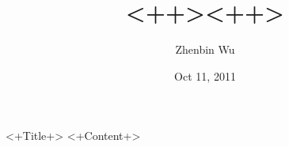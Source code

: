 \documentclass{beamer}
\title{<++><++>}
\author{Zhenbin Wu}
\institute{Baylor University}
\date{Oct 11, 2011}
\begin{document}
\begin{frame}[t,plain]
\titlepage
\end{frame}

\begin{frame}{<+Title+>}
<+Content+>
\end{frame}
\end{document}

